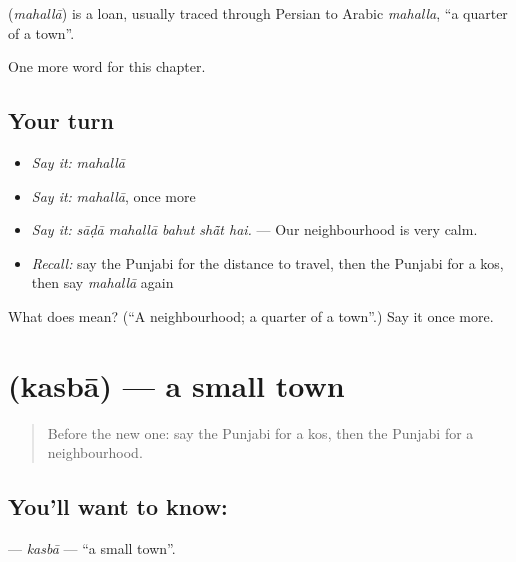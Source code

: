 \begin{cousinweb}
\textbf{} (\emph{mahallā}) is a loan, usually traced through Persian to Arabic \emph{mahalla}, \textquotedblleft{}a quarter of a town\textquotedblright{}.
\end{cousinweb}

\begin{grammarlens}[title={What you've built}]
One more word for this chapter.
\end{grammarlens}

\subsection*{Your turn}
\begin{itemize}
\raggedright
  \item \emph{Say it:} \emph{mahallā}
  \item \emph{Say it:} \emph{mahallā}, once more
  \item \emph{Say it:} \emph{sāḍā mahallā bahut shā̃t hai.} — Our neighbourhood is very calm.
  \item \emph{Recall:} say the Punjabi for the distance to travel, then the Punjabi for a kos, then say \emph{mahallā} again
\end{itemize}

\begin{tcolorbox}[breakable,colback=teal!4,colframe=teal!35!black,title={Before you move on}]
What does  mean? (\textquotedblleft{}A neighbourhood; a quarter of a town\textquotedblright{}.) Say it once more.
\end{tcolorbox}
\section[\texorpdfstring{\pa{ਕਸਬਾ} (kasbā)}{ਕਸਬਾ (kasbā)}]{ (kasbā) — a small town}

\label{lesson:PA-C266-kasba}



\begin{quote}
Before the new one: say the Punjabi for a kos, then the Punjabi for a neighbourhood.
\end{quote}

\subsection*{You'll want to know: }
\textbf{} — \emph{kasbā} — \textquotedblleft{}a small town\textquotedblright{}.


